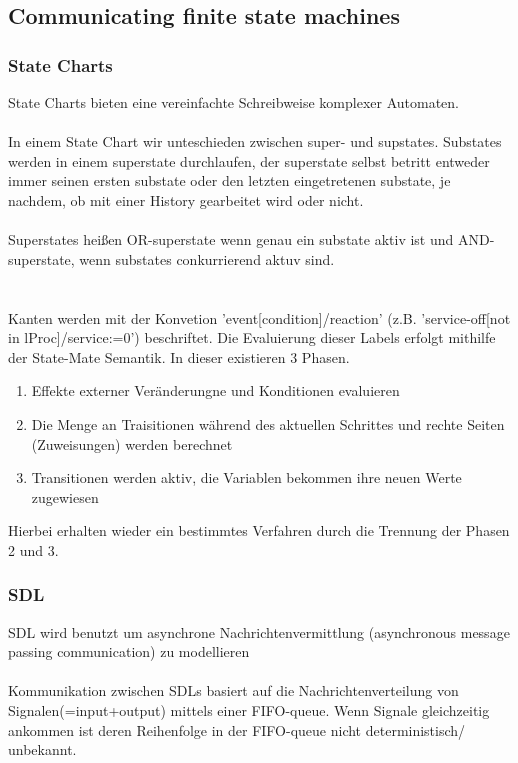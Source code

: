 \subsection{Communicating finite state machines}

\subsubsection{State Charts}
State Charts bieten eine vereinfachte Schreibweise komplexer Automaten.
\\ \\
In einem State Chart wir unteschieden zwischen super- und supstates.
Substates werden in einem superstate durchlaufen, der superstate selbst betritt entweder immer seinen
ersten substate oder den letzten eingetretenen substate, je nachdem, ob mit einer History gearbeitet wird
oder nicht.
\\ \\
Superstates heißen OR-superstate wenn genau ein substate aktiv ist und AND-superstate, wenn substates conkurrierend 
aktuv sind.
\\ \\
\\
Kanten werden mit der Konvetion 'event[condition]/reaction' (z.B. 'service-off[not in lProc]/service:=0') beschriftet.
Die Evaluierung dieser Labels erfolgt mithilfe der State-Mate Semantik.
In dieser existieren 3 Phasen.
\begin{enumerate}
    \item Effekte externer Veränderungne und Konditionen evaluieren
    \item Die Menge an Traisitionen während des aktuellen Schrittes und rechte Seiten (Zuweisungen) werden berechnet
    \item Transitionen werden aktiv, die Variablen bekommen ihre neuen Werte zugewiesen
\end{enumerate}
Hierbei erhalten wieder ein bestimmtes Verfahren durch die Trennung der Phasen 2 und 3.


\subsubsection{SDL}

SDL wird benutzt um asynchrone Nachrichtenvermittlung (asynchronous message passing communication) zu modellieren
\\ \\
Kommunikation zwischen SDLs basiert auf die Nachrichtenverteilung von Signalen(=input+output) mittels einer FIFO-queue.
Wenn Signale gleichzeitig ankommen ist deren Reihenfolge in der FIFO-queue nicht deterministisch/ unbekannt.



